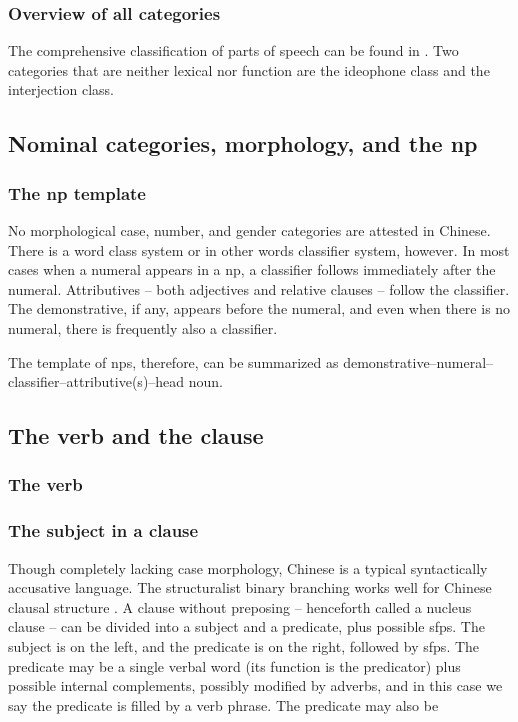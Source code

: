 \documentclass[UTF8, a4paper, oneside, scheme=plain]{ctexart}
\newcommand*{\citesec}[1]{\S~{#1}}
\begin{document}
\subsubsection{Overview of all categories}

The comprehensive classification of parts of speech can be found in \citet[\citesec{3.6}]{zhudexigrammar}.
Two categories that are neither lexical nor function 
are the ideophone class and the interjection class.


\subsection{Nominal categories, morphology, and the \ac{np}}

\subsubsection{The \ac{np} template}

No morphological case, number, and gender categories are attested in Chinese.
There is a word class system or in other words classifier system, however.
In most cases when a numeral appears in a \ac{np},
a classifier follows immediately after the numeral.
Attributives -- both adjectives and relative clauses -- 
follow the classifier. %
The demonstrative, if any, appears before the numeral,
and even when there is no numeral,
there is frequently also a classifier.

The template of \ac{np}s, therefore, can be summarized as 
demonstrative--numeral--classifier--attributive(s)--head noun.

\subsection{The verb and the clause}

\subsubsection{The verb}



\subsubsection{The subject in a clause}

Though completely lacking case morphology,
Chinese is a typical syntactically accusative language.
The structuralist binary branching works well for Chinese clausal structure 
\citep[\citesec{133-136}]{zhudexigrammar}.
A clause without preposing -- henceforth called a nucleus clause --
can be divided into a subject and a predicate,
plus possible \ac{sfp}s.
The subject is on the left, and the predicate is on the right, followed by \ac{sfp}s.
The predicate may be a 
single verbal word (its function is the predicator) plus possible internal complements, 
possibly modified by adverbs,
and in this case we say the predicate is filled by a verb phrase.
The predicate may also be 
\end{document}
